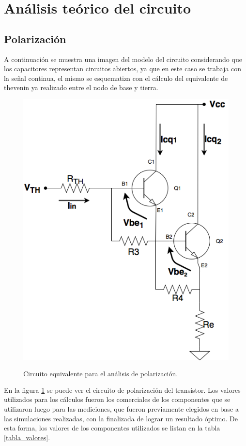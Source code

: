 \section{An\'alisis te\'orico del circuito}



	\subsection{Polarizaci\'on}
		A continuaci\'on se muestra una imagen del modelo del circuito considerando que los capacitores representan circuitos abiertos, ya que en este caso se trabaja con la señal continua, el mismo se esquematiza con el cálculo del equivalente de thevenin ya realizado entre el nodo de base y tierra.\\
		\begin{figure}[H]
			\centering
			\includegraphics[scale=0.4]{./Imagenes/polarizacion.png} \\
			\caption{Circuito equivalente para el an\'alisis de polarizaci\'on.}
			\label{polarizacion}
		\end{figure}

En la figura \ref{polarizacion} se puede ver el circuito de polarización del transistor. Los valores utilizados para los cálculos fueron los comerciales de los componentes que se utilizaron luego para las mediciones, que fueron previamente elegidos en base a las simulaciones realizadas, con la finalizada de lograr un resultado óptimo. De esta forma, los valores de los componentes utilizados se listan en la tabla \ref{tabla_valores}.


